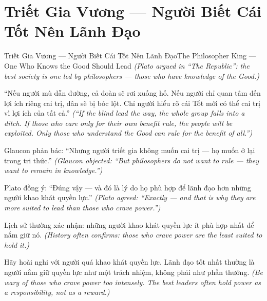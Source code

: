 \section{Triết Gia Vương — Người Biết Cái Tốt Nên Lãnh Đạo}
\begin{truyen}{Triết Gia Vương — Người Biết Cái Tốt Nên Lãnh Đạo}{The Philosopher King — One Who Knows the Good Should Lead}
\textit{(Plato argued in ``The Republic'': the best society is one led by philosophers — those who have knowledge of the Good.)}

``Nếu người mù dẫn đường, cả đoàn sẽ rơi xuống hố. Nếu người chỉ quan tâm đến lợi ích riêng cai trị, dân sẽ bị bóc lột. Chỉ người hiểu rõ cái Tốt mới có thể cai trị vì lợi ích của tất cả.''
\textit{(``If the blind lead the way, the whole group falls into a ditch. If those who care only for their own benefit rule, the people will be exploited. Only those who understand the Good can rule for the benefit of all.'')}

Glaucon phản bác: ``Nhưng người triết gia không muốn cai trị — họ muốn ở lại trong tri thức.''
\textit{(Glaucon objected: ``But philosophers do not want to rule — they want to remain in knowledge.'')}

Plato đồng ý: ``Đúng vậy — và đó là lý do họ phù hợp để lãnh đạo hơn những người khao khát quyền lực.''
\textit{(Plato agreed: ``Exactly — and that is why they are more suited to lead than those who crave power.'')}

Lịch sử thường xác nhận: những người khao khát quyền lực ít phù hợp nhất để nắm giữ nó.
\textit{(History often confirms: those who crave power are the least suited to hold it.)}

\end{truyen}

\begin{baihoc}
Hãy hoài nghi với người quá khao khát quyền lực. Lãnh đạo tốt nhất thường là người nắm giữ quyền lực như một trách nhiệm, không phải như phần thưởng.
\textit{(Be wary of those who crave power too intensely. The best leaders often hold power as a responsibility, not as a reward.)}
\end{baihoc}
\ngancach

